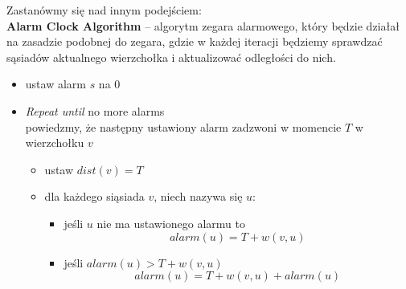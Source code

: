 \documentclass[11pt,a4paper]{article}
\begin{document}
Zastanówmy się nad innym podejściem:\\
\textbf{Alarm Clock Algorithm} -- algorytm zegara alarmowego, który będzie działał na zasadzie podobnej do zegara, gdzie w każdej iteracji będziemy sprawdzać sąsiadów aktualnego wierzchołka i aktualizować odległości do nich.
\begin{itemize}
    \item ustaw alarm $s$ na $0$
    \item \textit{Repeat until} no more alarms \\
        powiedzmy, że następny ustawiony alarm zadzwoni w momencie $T$ w wierzchołku $v$
        \begin{itemize}
            \item ustaw $dist(v)=T$
            \item dla każdego siąsiada $v$, niech nazywa się $u$:
                \begin{itemize}
                    \item jeśli $u$ nie ma ustawionego alarmu to
                        \[
                            alarm(u)=T+w(v,u)
                        \]
                    \item jeśli $alarm(u) > T+w(v,u)$
                        \[
                            alarm(u)=T+w(v,u)+ alarm(u)
                        \]
                \end{itemize}
        \end{itemize}
\end{itemize}
\end{document}
